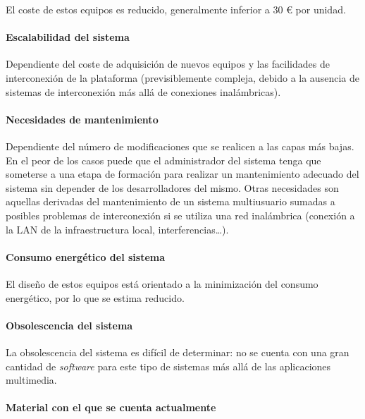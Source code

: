 El coste de estos equipos es reducido, generalmente inferior a 30 € por unidad.

\paragraph{Escalabilidad del sistema\\}

Dependiente del coste de adquisición de nuevos equipos y las facilidades de interconexión de la plataforma (previsiblemente compleja, debido a la ausencia de sistemas de interconexión más allá de conexiones inalámbricas).

\paragraph{Necesidades de mantenimiento\\}

Dependiente del número de modificaciones que se realicen a las capas más bajas. En el peor de los casos puede que el administrador del sistema tenga que someterse a una etapa de formación para realizar un mantenimiento adecuado del sistema sin depender de los desarrolladores del mismo.
Otras necesidades son aquellas derivadas del mantenimiento de un sistema multiusuario sumadas a posibles problemas de interconexión si se utiliza una red inalámbrica (conexión a la LAN de la infraestructura local, interferencias\dots).

\paragraph{Consumo energético del sistema\\}

El diseño de estos equipos está orientado a la minimización del consumo energético, por lo que se estima reducido.

\paragraph{Obsolescencia del sistema\\}

La obsolescencia del sistema es difícil de determinar: no se cuenta con una gran cantidad de \textit{software} para este tipo de sistemas más allá de las aplicaciones multimedia.%

\paragraph{Material con el que se cuenta actualmente\\}


